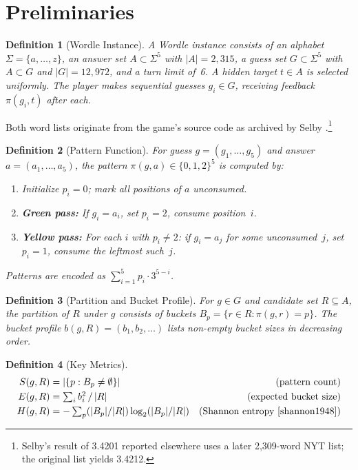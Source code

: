 \documentclass[11pt]{article}
\newtheorem{definition}{Definition}
\begin{document}
	\section{Preliminaries}
	
	\begin{definition}[Wordle Instance]
		A Wordle instance consists of an alphabet $\Sigma = \{a,\ldots,z\}$, an answer set $A \subset \Sigma^5$ with $|A| = 2{,}315$, a guess set $G \subset \Sigma^5$ with $A \subset G$ and $|G| = 12{,}972$, and a turn limit of~6.  A hidden target $t \in A$ is selected uniformly.  The player makes sequential guesses $g_i \in G$, receiving feedback $\pi(g_i, t)$ after each.
	\end{definition}
	
	Both word lists originate from the game's source code as archived by Selby \cite{selby2022}.\footnote{Selby's result of 3.4201 reported elsewhere uses a later 2,309-word NYT list; the original list yields 3.4212.}
	
	\begin{definition}[Pattern Function]
		For guess $g = (g_1,\ldots,g_5)$ and answer $a = (a_1,\ldots,a_5)$, the pattern $\pi(g,a) \in \{0,1,2\}^5$ is computed by:
		\begin{enumerate}
			\item Initialize $p_i = 0$; mark all positions of $a$ unconsumed.
			\item \textbf{Green pass:} If $g_i = a_i$, set $p_i = 2$, consume position~$i$.
			\item \textbf{Yellow pass:} For each $i$ with $p_i \neq 2$: if $g_i = a_j$ for some unconsumed~$j$, set $p_i = 1$, consume the leftmost such~$j$.
		\end{enumerate}
		Patterns are encoded as $\sum_{i=1}^{5} p_i \cdot 3^{5-i}$.
	\end{definition}
	
	\begin{definition}[Partition and Bucket Profile]
		For $g \in G$ and candidate set $R \subseteq A$, the partition of $R$ under $g$ consists of buckets $B_p = \{r \in R : \pi(g,r) = p\}$.  The bucket profile $b(g,R) = (b_1, b_2, \ldots)$ lists non-empty bucket sizes in decreasing order.
	\end{definition}
	
	\begin{definition}[Key Metrics]\leavevmode
		\begin{align}
			S(g,R) &= |\{p : B_p \neq \emptyset\}| & \text{(pattern count)} \label{eq:S}\\
			E(g,R) &= \textstyle\sum_i b_i^2 \,/\, |R| & \text{(expected bucket size)} \label{eq:E}\\
			H(g,R) &= -\textstyle\sum_p (|B_p|/|R|)\log_2(|B_p|/|R|) & \text{(Shannon entropy \cite{shannon1948})} \label{eq:H}
		\end{align}
	\end{definition}
	
\end{document}
